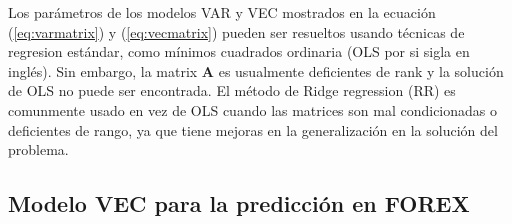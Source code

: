Los parámetros de los modelos VAR y VEC mostrados en la ecuación
(\ref{eq:varmatrix}) y (\ref{eq:vecmatrix}) pueden ser resueltos usando
técnicas de regresion estándar, como mínimos cuadrados ordinaria (OLS por si
sigla en inglés). Sin embargo, la matrix $\mathbf{A}$ es usualmente deficientes
de rank y la solución de OLS no puede ser encontrada.  El método de Ridge
regression (RR) es comunmente usado en vez de OLS cuando las matrices son mal
condicionadas o deficientes de rango, ya que tiene mejoras en la generalización
en la solución del problema.



\subsection{Modelo VEC para la predicción en FOREX}
